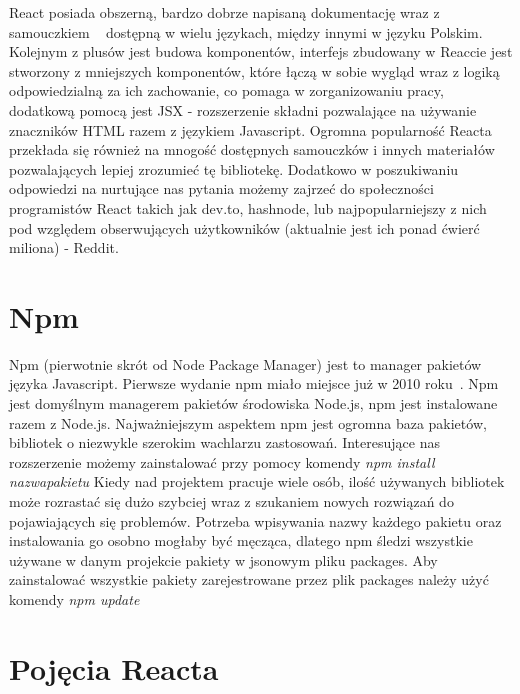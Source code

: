 \documentclass[oneside,polski,logo,indent]{amuthesis}
\begin{document}
{React posiada obszerną, bardzo dobrze napisaną dokumentację wraz z samouczkiem 
~\cite{reactjs} dostępną w wielu językach, między innymi w języku Polskim.
Kolejnym z plusów jest budowa komponentów, interfejs zbudowany w Reaccie jest stworzony z mniejszych komponentów, które łączą w sobie wygląd wraz z logiką odpowiedzialną za ich zachowanie, co pomaga w zorganizowaniu pracy, dodatkową pomocą jest JSX - rozszerzenie składni pozwalające na używanie znaczników HTML razem z językiem Javascript.
Ogromna popularność Reacta przekłada się również na mnogość dostępnych samouczków i innych materiałów pozwalających lepiej zrozumieć tę bibliotekę. Dodatkowo w poszukiwaniu odpowiedzi na nurtujące nas pytania możemy zajrzeć do społeczności programistów React takich jak dev.to, hashnode, lub najpopularniejszy z nich pod względem obserwujących użytkowników (aktualnie jest ich ponad ćwierć miliona) - Reddit.

}



\section{Npm}{

Npm (pierwotnie skrót od Node Package Manager) jest to manager pakietów języka Javascript. Pierwsze wydanie npm miało miejsce już w 2010 roku~\cite{npmwiki}.
Npm jest domyślnym managerem pakietów środowiska Node.js, npm jest instalowane razem z Node.js. Najważniejszym aspektem npm jest ogromna baza pakietów, bibliotek o 
niezwykle szerokim wachlarzu zastosowań. Interesujące nas rozszerzenie możemy zainstalować przy pomocy komendy
\newline
\textit{npm install nazwapakietu}
\newline
Kiedy nad projektem pracuje wiele osób, ilość używanych bibliotek może rozrastać się dużo szybciej wraz z szukaniem nowych rozwiązań do pojawiających się problemów.
Potrzeba wpisywania nazwy każdego pakietu oraz instalowania go osobno mogłaby być męcząca, dlatego npm śledzi wszystkie używane w danym projekcie pakiety w jsonowym pliku
packages. Aby zainstalować wszystkie pakiety zarejestrowane przez plik packages należy użyć komendy
\newline
\textit{npm update}
\newline





}



\section{Pojęcia Reacta}
\end{document}
